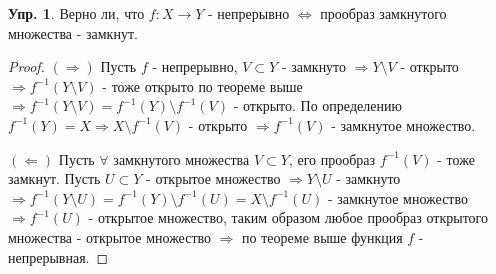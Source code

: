 \documentclass[12pt]{article}
\theoremstyle{definition}
\newtheorem{exrc}{Упр.}
\begin{document}
\begin{exrc}
	Верно ли, что $f \colon X \to Y$ - непрерывно $\Leftrightarrow$ прообраз замкнутого множества - замкнут.
\end{exrc}
\begin{proof}
	$(\Rightarrow)$ Пусть $f$ - непрерывно, $V \subset Y$ - замкнуто $\Rightarrow Y \setminus V$ - открыто $\Rightarrow f^{-1}(Y\setminus V)$ - тоже открыто по теореме выше $\Rightarrow f^{-1}(Y\setminus V) = f^{-1}(Y)\setminus f^{-1}(V)$ - открыто. По определению $f^{-1}(Y) = X \Rightarrow X \setminus f^{-1}(V)$ - открыто $\Rightarrow f^{-1}(V)$ - замкнутое множество.
	
	$(\Leftarrow)$ Пусть $\forall$ замкнутого множества $V \subset Y$, его прообраз $f^{-1}(V)$ - тоже замкнут. Пусть $U \subset Y$ - открытое множество $\Rightarrow Y\setminus U$ - замкнуто $\Rightarrow f^{-1}(Y \setminus U ) = f^{-1}(Y)\setminus f^{-1}(U) = X \setminus f^{-1}(U)$ - замкнутое множество $\Rightarrow f^{-1}(U)$ - открытое множество, таким образом любое прообраз открытого множества - открытое множество $\Rightarrow$ по теореме выше функция $f$ - непрерывная.
\end{proof}
\end{document}

